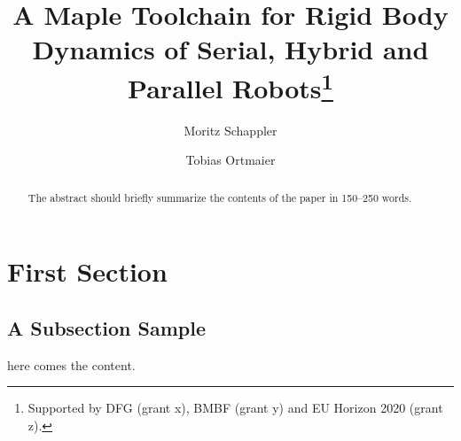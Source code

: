 \documentclass[runningheads]{llncs}
\begin{document}
%
\title{A Maple Toolchain for Rigid Body Dynamics of Serial, Hybrid and Parallel Robots\thanks{Supported by DFG (grant x), BMBF (grant y) and EU Horizon 2020 (grant z).}}
%
%
\author{Moritz Schappler \and
Tobias Ortmaier}
%
%
%
\maketitle              %
%
\begin{abstract}
The abstract should briefly summarize the contents of the paper in
150--250 words.

\end{abstract}
%
%
%
\section{First Section}
\subsection{A Subsection Sample}

here comes the content.

%
%
%


\end{document}
